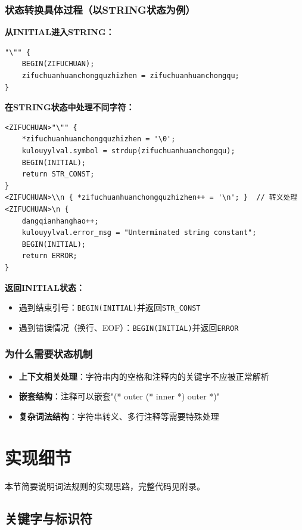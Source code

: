 \documentclass[twocolumn]{article}
\begin{document}
\subsubsection{状态转换具体过程（以STRING状态为例）}

\textbf{从INITIAL进入STRING：}
\begin{lstlisting}[language=Flex, caption={进入STRING状态}]
"\"" { 
    BEGIN(ZIFUCHUAN); 
    zifuchuanhuanchongquzhizhen = zifuchuanhuanchongqu; 
}
\end{lstlisting}

\textbf{在STRING状态中处理不同字符：}
\begin{lstlisting}[language=Flex, caption={STRING状态中的字符处理}]
<ZIFUCHUAN>"\"" { 
    *zifuchuanhuanchongquzhizhen = '\0';
    kulouyylval.symbol = strdup(zifuchuanhuanchongqu);
    BEGIN(INITIAL);
    return STR_CONST;
}
<ZIFUCHUAN>\\n { *zifuchuanhuanchongquzhizhen++ = '\n'; }  // 转义处理
<ZIFUCHUAN>\n { 
    dangqianhanghao++; 
    kulouyylval.error_msg = "Unterminated string constant";
    BEGIN(INITIAL);
    return ERROR;
}
\end{lstlisting}

\textbf{返回INITIAL状态：}
\begin{itemize}
    \item 遇到结束引号：\texttt{BEGIN(INITIAL)}并返回\texttt{STR\_CONST}
    \item 遇到错误情况（换行、EOF）：\texttt{BEGIN(INITIAL)}并返回\texttt{ERROR}
\end{itemize}

\subsubsection{为什么需要状态机制}
\begin{itemize}
    \item \textbf{上下文相关处理}：字符串内的空格和注释内的关键字不应被正常解析
    \item \textbf{嵌套结构}：注释可以嵌套"(* outer (* inner *) outer *)"
    \item \textbf{复杂词法结构}：字符串转义、多行注释等需要特殊处理
\end{itemize}


\section{实现细节}
本节简要说明词法规则的实现思路，完整代码见附录。

\subsection{关键字与标识符}
\end{document}
